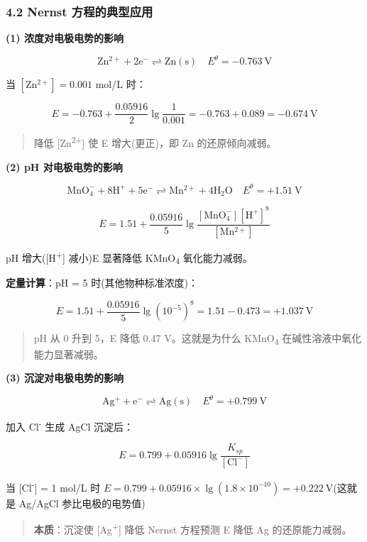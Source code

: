 \subsubsection{4.2 Nernst 方程的典型应用}\label{nernst-ux65b9ux7a0bux7684ux5178ux578bux5e94ux7528}

\textbf{(1) 浓度对电极电势的影响}

\[
\mathrm{Zn^{2+} + 2e^- \rightleftharpoons Zn(s)} \quad E^\theta = -0.763\ \mathrm{V}
\]

当 \([\mathrm{Zn^{2+}}] = 0.001\) mol/L 时：

\[
E = -0.763 + \frac{0.05916}{2}\lg\frac{1}{0.001} = -0.763 + 0.089 = -0.674\ \mathrm{V}
\]

\begin{quote}
降低 {[}Zn\textsuperscript{2+}{]} 使 E 增大(更正)，即 Zn 的还原倾向减弱。
\end{quote}

\textbf{(2) pH 对电极电势的影响}

\[
\mathrm{MnO_4^- + 8H^+ + 5e^- \rightleftharpoons Mn^{2+} + 4H_2O} \quad E^\theta = +1.51\ \mathrm{V}
\]

\[
E = 1.51 + \frac{0.05916}{5}\lg\frac{[\mathrm{MnO_4^-}][\mathrm{H^+}]^8}{[\mathrm{Mn^{2+}}]}
\]

pH 增大({[}H\textsuperscript{+}{]} 减小)\箭 E 显著降低 \箭 KMnO\textsubscript{4} 氧化能力减弱。

\textbf{定量计算}：pH = 5 时(其他物种标准浓度)：

\[E = 1.51 + \frac{0.05916}{5}\lg(10^{-5})^8 = 1.51 - 0.473 = +1.037\ \mathrm{V}\]

\begin{quote}
pH 从 0 升到 5，E 降低 0.47 V。这就是为什么 KMnO\textsubscript{4} 在碱性溶液中氧化能力显著减弱。
\end{quote}

\textbf{(3) 沉淀对电极电势的影响}

\[
\mathrm{Ag^+ + e^- \rightleftharpoons Ag(s)} \quad E^\theta = +0.799\ \mathrm{V}
\]

加入 Cl\textsuperscript{-} 生成 AgCl 沉淀后：

\[
E = 0.799 + 0.05916\lg\frac{K_{sp}}{[\mathrm{Cl^-}]}
\]

当 {[}Cl\textsuperscript{-}{]} = 1 mol/L 时 \(E = 0.799 + 0.05916 \times \lg(1.8 \times 10^{-10}) = +0.222\ \mathrm{V}\)(这就是 Ag/AgCl 参比电极的电势值)

\begin{quote}
\textbf{本质}：沉淀使 {[}Ag\textsuperscript{+}{]} 降低 \箭 Nernst 方程预测 E 降低 \箭 Ag 的还原能力减弱。
\end{quote}

